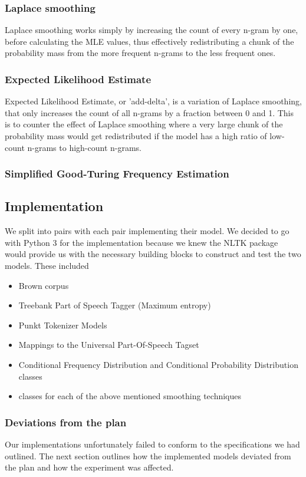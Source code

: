\documentclass[a4paper,12pt]{article}
\begin{document}
\subsubsection{Laplace smoothing}
Laplace smoothing works simply by increasing the count of every n-gram by one, before calculating the MLE values, thus effectively redistributing a chunk of the probability mass from the more frequent n-grams to the less frequent ones.

\subsubsection{Expected Likelihood Estimate}
Expected Likelihood Estimate, or 'add-delta', is a variation of Laplace smoothing, that only increases the count of all n-grams by a fraction between 0 and 1. This is to counter the effect of Laplace smoothing where a very large chunk of the probability mass would get redistributed if the model has a high ratio of low-count n-grams to high-count n-grams.

\subsubsection{Simplified Good-Turing Frequency Estimation}


\subsection{Implementation}
\label{sec:impl}

We split into pairs with each pair implementing their model. We decided to go with Python 3 for the implementation because we knew the NLTK package would provide us with the necessary building blocks to construct and test the two models. These included
\begin{itemize}
\item Brown corpus
\item Treebank Part of Speech Tagger (Maximum entropy)
\item Punkt Tokenizer Models
\item Mappings to the Universal Part-Of-Speech Tagset
\item Conditional Frequency Distribution and Conditional Probability Distribution classes
\item classes for each of the above mentioned smoothing techniques
\end{itemize}

\subsubsection{Deviations from the plan}
Our implementations unfortunately failed to conform to the specifications we had outlined. The next section outlines how the implemented models deviated from the plan and how the experiment was affected.
\end{document}
